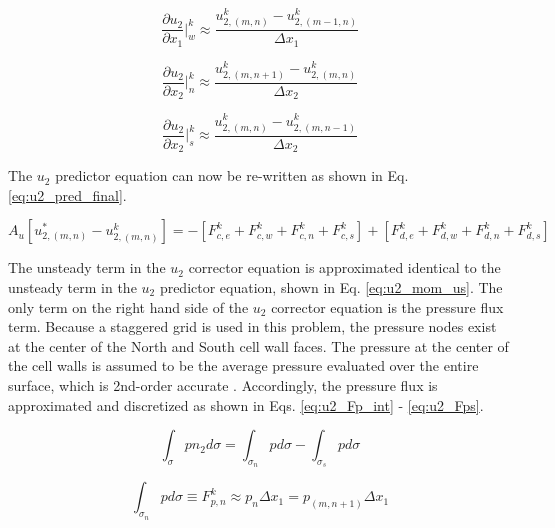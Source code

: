 \documentclass[10pt, letterpaper]{article}
\begin{document}
\begin{equation}
  \frac{\partial{u_{2}}}{\partial{x_{1}}}\bigg|_{w}^{k}\approx
  \frac{u_{2,(m,n)}^{k} - u_{2,(m-1,n)}^{k}}{\Delta{x_{1}}}
  \label{eq:u2_du2dx1_w}
\end{equation}

\begin{equation}
  \frac{\partial{u_{2}}}{\partial{x_{2}}}\bigg|_{n}^{k}\approx
  \frac{u_{2,(m,n+1)}^{k} - u_{2,(m,n)}^{k}}{\Delta{x_{2}}}
  \label{eq:u2_du2dx2_n}
\end{equation}

\begin{equation}
  \frac{\partial{u_{2}}}{\partial{x_{2}}}\bigg|_{s}^{k}\approx
  \frac{u_{2,(m,n)}^{k} - u_{2,(m,n-1)}^{k}}{\Delta{x_{2}}}
  \label{eq:u2_du2dx2_s}
\end{equation}

The $u_{2}$ predictor equation can now be re-written as shown in Eq. \ref{eq:u2_pred_final}.

\begin{equation}
  \boxed{
    A_{u}[u_{2,(m,n)}^{*} - u_{2,(m,n)}^{k}] = - [F_{c,e}^{k} + F_{c,w}^{k} + F_{c,n}^{k} + F_{c,s}^{k}] + [F_{d,e}^{k} + F_{d,w}^{k} + F_{d,n}^{k} + F_{d,s}^{k}]
  }
  \label{eq:u2_pred_final}
\end{equation}


The unsteady term in the $u_{2}$ corrector equation is approximated identical to the unsteady term in the $u_{2}$ predictor equation, shown in Eq. \ref{eq:u2_mom_us}. The only term on the right hand side of the $u_{2}$ corrector equation is the pressure flux term. Because a staggered grid is used in this problem, the pressure nodes exist at the center of the North and South cell wall faces. The pressure at the center of the cell walls is assumed to be the average pressure evaluated over the entire surface, which is 2nd-order accurate \cite{Ferziger_Springer_2002}. Accordingly, the pressure flux is approximated and discretized as shown in Eqs. \ref{eq:u2_Fp_int} - \ref{eq:u2_Fps}.

\begin{equation}
  \int_{\sigma}pn_{2}d\sigma = \int_{\sigma_{n}}pd\sigma - \int_{\sigma_{s}}pd\sigma
  \label{eq:u2_Fp_int}
\end{equation}

\begin{equation}
  \int_{\sigma_{n}}pd\sigma \equiv F_{p,n}^{k} \approx p_{n}\Delta{x_{1}} = p_{(m,n+1)}\Delta{x_{1}}
  \label{eq:u2_Fpn}
\end{equation}
\end{document}
